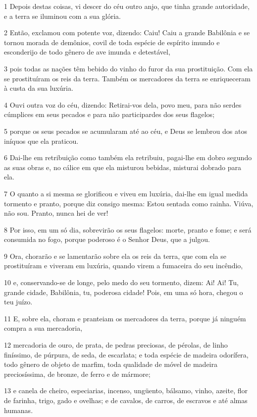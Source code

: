 \par 1 Depois destas coisas, vi descer do céu outro anjo, que tinha grande autoridade, e a terra se iluminou com a sua glória.
\par 2 Então, exclamou com potente voz, dizendo: Caiu! Caiu a grande Babilônia e se tornou morada de demônios, covil de toda espécie de espírito imundo e esconderijo de todo gênero de ave imunda e detestável,
\par 3 pois todas as nações têm bebido do vinho do furor da sua prostituição. Com ela se prostituíram os reis da terra. Também os mercadores da terra se enriqueceram à custa da sua luxúria.
\par 4 Ouvi outra voz do céu, dizendo: Retirai-vos dela, povo meu, para não serdes cúmplices em seus pecados e para não participardes dos seus flagelos;
\par 5 porque os seus pecados se acumularam até ao céu, e Deus se lembrou dos atos iníquos que ela praticou.
\par 6 Dai-lhe em retribuição como também ela retribuiu, pagai-lhe em dobro segundo as suas obras e, no cálice em que ela misturou bebidas, misturai dobrado para ela.
\par 7 O quanto a si mesma se glorificou e viveu em luxúria, dai-lhe em igual medida tormento e pranto, porque diz consigo mesma: Estou sentada como rainha. Viúva, não sou. Pranto, nunca hei de ver!
\par 8 Por isso, em um só dia, sobrevirão os seus flagelos: morte, pranto e fome; e será consumida no fogo, porque poderoso é o Senhor Deus, que a julgou.
\par 9 Ora, chorarão e se lamentarão sobre ela os reis da terra, que com ela se prostituíram e viveram em luxúria, quando virem a fumaceira do seu incêndio,
\par 10 e, conservando-se de longe, pelo medo do seu tormento, dizem: Ai! Ai! Tu, grande cidade, Babilônia, tu, poderosa cidade! Pois, em uma só hora, chegou o teu juízo.
\par 11 E, sobre ela, choram e pranteiam os mercadores da terra, porque já ninguém compra a sua mercadoria,
\par 12 mercadoria de ouro, de prata, de pedras preciosas, de pérolas, de linho finíssimo, de púrpura, de seda, de escarlata; e toda espécie de madeira odorífera, todo gênero de objeto de marfim, toda qualidade de móvel de madeira preciosíssima, de bronze, de ferro e de mármore;
\par 13 e canela de cheiro, especiarias, incenso, ungüento, bálsamo, vinho, azeite, flor de farinha, trigo, gado e ovelhas; e de cavalos, de carros, de escravos e até almas humanas.
